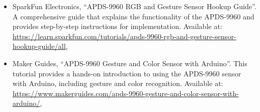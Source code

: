 \begin{itemize}
	
	\item SparkFun Electronics, ``APDS-9960 RGB and Gesture Sensor Hookup Guide''. A comprehensive guide that explains the functionality of the APDS-9960 and provides step-by-step instructions for implementation. Available at: \url{https://learn.sparkfun.com/tutorials/apds-9960-rgb-and-gesture-sensor-hookup-guide/all}, \cite{Hymel:2024}
	
	\item Maker Guides, ``APDS-9960 Gesture and Color Sensor with Arduino''. This tutorial provides a hands-on introduction to using the APDS-9960 sensor with Arduino, including gesture and color recognition. Available at: \url{https://www.makerguides.com/apds-9960-gesture-and-color-sensor-with-arduino/}, \cite{Maetschke:2024}
\end{itemize}



